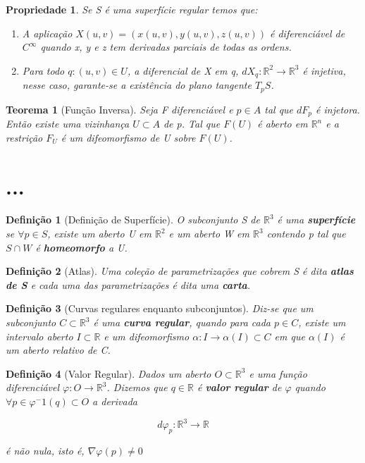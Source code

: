 \documentclass{article}
\newtheorem{prop}{Propriedade}
\newtheorem{theorem}{Teorema}
\newtheorem{definition}{Definição}
\begin{document}
\begin{prop}
Se S é uma superfície regular temos que:

\begin{enumerate}[label=(\alph*)]
    \item A aplicação $X(u, v) = (x(u, v), y(u, v), z(u, v))$ é diferenciável de $C^\infty$ quando x, y e z tem derivadas parciais de todas as ordens.
    
    \item Para todo $q: (u, v) \in U$, a diferencial de X em q, $dX_q: \mathbb{R}^2 \rightarrow \mathbb{R}^3$ é injetiva, nesse caso, garante-se a existência do plano tangente $T_p S$.
\end{enumerate}
\end{prop}

\begin{theorem}[Função Inversa]
Seja F diferenciável e $p \in A$ tal que $dF_p$ é injetora. Então existe uma vizinhança $U \subset A$ de p. Tal que $F(U)$ é aberto em $\mathbb{R}^n$ e a restrição $F_U$ é um difeomorfismo de U sobre $F(U)$.
\end{theorem}

\section*{...}
\label{s8}
\begin{definition}[Definição de Superfície]
O subconjunto S de $\mathbb{R}^3$ é uma \textbf{superfície} se $\forall p \in S$, existe um aberto U em $\mathbb{R}^2$ e um aberto W em $\mathbb{R}^3$ contendo p tal que $S \cap W$ é \textbf{homeomorfo} a U.
\end{definition}

\begin{definition}[Atlas]
Uma coleção de parametrizações que cobrem S é dita \textbf{atlas de S} e cada uma das parametrizações é dita uma \textbf{carta}.
\end{definition}

\begin{definition}[Curvas regulares enquanto subconjuntos]
Diz-se que um subconjunto $C \subset \mathbb{R}^3$ é uma \textbf{curva regular}, quando para cada $p \in C$, existe um intervalo aberto $I \subset \mathbb{R}$ e um difeomorfismo $\alpha: I \rightarrow \alpha(I) \subset C$ em que $\alpha(I)$ é um aberto relativo de C.
\end{definition}

\begin{definition}[Valor Regular]
Dados um aberto $O \subset \mathbb{R}^3$ e uma função diferenciável $\varphi: O \rightarrow \mathbb{R}^3$. Dizemos que $q \in \mathbb{R}$ é \textbf{valor regular} de $\varphi$ quando $\forall p \in \varphi^-1(q) \subset O$ a derivada

$$d\varphi_p: \mathbb{R}^3 \rightarrow \mathbb{R}$$

é não nula, isto é, $\nabla \varphi(p) \neq 0$
\end{definition}
\end{document}
